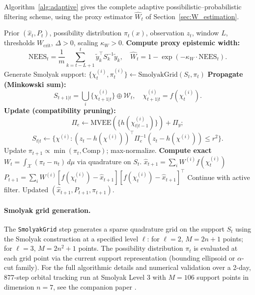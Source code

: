 \documentclass[12pt]{article}
\newcommand{\calX}{\mathcal{X}}
\newcommand{\Wcrit}{W_\mathrm{crit}}
\begin{document}
Algorithm~\ref{alg:adaptive} gives the complete adaptive possibilistic--probabilistic
filtering scheme, using the proxy estimator $\widehat{W}_t$ of
Section~\ref{sec:W_estimation}.

\begin{algorithm}[h!]
\caption{Adaptive Possibilistic--Probabilistic Filtering}
\label{alg:adaptive}
\begin{algorithmic}[1]
\Require Prior $(\hat{x}_t, P_t)$, possibility distribution $\pi_t(x)$,
         observation $z_t$, window $L$, thresholds $\Wcrit$, $\Delta>0$,
         scaling $\kappa_W>0$.
\State \textbf{Compute proxy epistemic width:}
\[
\mathrm{NEES}_t = \frac{1}{m}\sum_{k=t-L+1}^t \tilde{y}_k^\top S_k^{-1}\tilde{y}_k,
\quad
\widehat{W}_t = 1-\exp(-\kappa_W\cdot\mathrm{NEES}_t).
\]
\If{$\widehat{W}_t > \Wcrit + \Delta$} 
  \State Generate Smolyak support: $\{\chi^{(i)}_t,\pi^{(i)}_t\} \gets \mathrm{SmolyakGrid}(S_t,\pi_t)$
  \State \textbf{Propagate (Minkowski sum):}
  \[S_{t+1|t} = \bigcup_i\{\chi^{(i)}_{t+1|t}\}\oplus\mathcal{W}_t, \quad
    \chi^{(i)}_{t+1|t}=f(\chi^{(i)}_t).\]
  \State \textbf{Update (compatibility pruning):}
  \[\Pi_e \gets \mathrm{MVEE}(\{h(\chi^{(i)}_{t|t-1})\})+\Pi_y;\]
  \[S_{t|t} \gets \{\chi^{(i)}: (z_t-h(\chi^{(i)}))^\top\Pi_e^{-1}(z_t-h(\chi^{(i)}))\le r^2\}.\]
  \State Update $\pi_{t+1} \propto \min(\pi_t, \mathrm{Comp})$; max-normalize.
  \State \textbf{Compute exact} $W_t=\int_\calX(\pi_t-n_t)\,d\mu$ via quadrature on $S_t$.
\ElsIf{$\widehat{W}_t < \Wcrit - \Delta$} 
  \State $\hat{x}_{t+1} = \sum_i W^{(i)}f(\chi^{(i)}_t)$
  \State $P_{t+1} = \sum_i W^{(i)}[f(\chi^{(i)}_t)-\hat{x}_{t+1}][f(\chi^{(i)}_t)-\hat{x}_{t+1}]^\top$
\Else {}
  \State Continue with active filter.
\EndIf
\Ensure Updated $(\hat{x}_{t+1}, P_{t+1}, \pi_{t+1})$.
\end{algorithmic}
\end{algorithm}

\paragraph{Smolyak grid generation.}
The \texttt{SmolyakGrid} step generates a sparse quadrature grid on the support
$S_t$ using the Smolyak construction at a specified level $\ell$:
for $\ell=2$, $M=2n+1$ points; for $\ell=3$, $M=2n^2+1$ points.
The possibility distribution $\pi_t$ is evaluated at each grid point via the
current support representation (bounding ellipsoid or $\alpha$-cut family).
For the full algorithmic details and numerical validation over a 2-day,
877-step orbital tracking run at Smolyak Level 3 with $M=106$ support points
in dimension $n=7$, see the companion paper \cite{jah2026optimality}.
\end{document}
